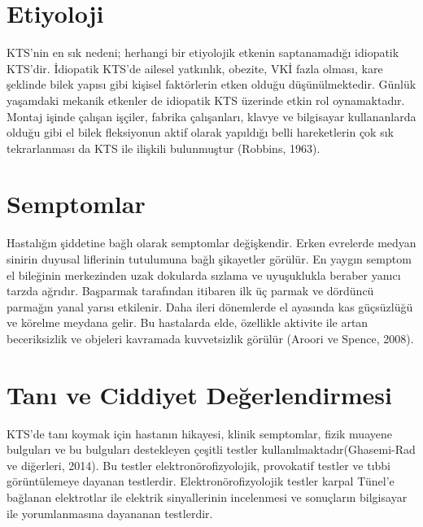 \documentclass[12pt,twoside]{deuthesis}
\begin{document}
\hypertarget{KTSEtiyoloji}{%
\section{Etiyoloji}\label{KTSEtiyoloji}}

KTS'nin en sık nedeni; herhangi bir etiyolojik etkenin saptanamadığı idiopatik KTS'dir. İdiopatik KTS'de ailesel yatkınlık, obezite, VKİ fazla olması, kare şeklinde bilek yapısı gibi
kişisel faktörlerin etken olduğu düşünülmektedir. Günlük yaşamdaki mekanik etkenler de idiopatik KTS
üzerinde etkin rol oynamaktadır. Montaj işinde çalışan işçiler, fabrika çalışanları, klavye ve bilgisayar
kullananlarda olduğu gibi el bilek fleksiyonun aktif olarak yapıldığı belli hareketlerin çok sık
tekrarlanması da KTS ile ilişkili bulunmuştur (Robbins, 1963).

\hypertarget{KTSSemptom}{%
\section{Semptomlar}\label{KTSSemptom}}

Hastalığın şiddetine bağlı olarak semptomlar değişkendir. Erken evrelerde medyan sinirin duyusal
liflerinin tutulumuna bağlı şikayetler görülür. En yaygın semptom el bileğinin merkezinden uzak
dokularda sızlama ve uyuşuklukla beraber yanıcı tarzda ağrıdır. Başparmak tarafından itibaren ilk üç
parmak ve dördüncü parmağın yanal yarısı etkilenir. Daha ileri dönemlerde el ayasında kas
güçsüzlüğü ve körelme meydana gelir. Bu hastalarda elde, özellikle aktivite ile artan beceriksizlik ve objeleri kavramada kuvvetsizlik görülür (Aroori ve Spence, 2008).

\hypertarget{KTSTani_Ciddi}{%
\section{Tanı ve Ciddiyet Değerlendirmesi}\label{KTSTani_Ciddi}}

KTS'de tanı koymak için hastanın hikayesi, klinik semptomlar, fizik muayene bulguları ve bu bulguları destekleyen çeşitli testler kullanılmaktadır(Ghasemi-Rad ve diğerleri, 2014).
Bu testler elektronörofizyolojik, provokatif testler ve tıbbi görüntülemeye dayanan testlerdir.
Elektronörofizyolojik testler karpal Tünel'e bağlanan elektrotlar ile elektrik sinyallerinin incelenmesi ve sonuçların bilgisayar ile yorumlanmasına dayananan testlerdir.
\end{document}
